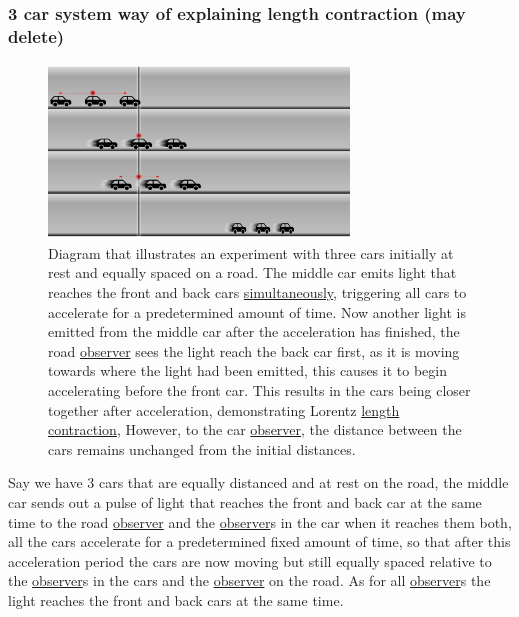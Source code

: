 \subsubsection{3 car system way of explaining length contraction (may delete)}

\begin{figure}[ht]
	\centering
	\includegraphics[width=8cm]{images/pdf/cars.pdf}
	\caption{Diagram that illustrates an experiment with three cars initially at rest and equally spaced on a road. The middle car emits light that reaches the front and back cars \protect\hyperlink{def-simultaneity}{simultaneously}, triggering all cars to accelerate for a predetermined amount of time. Now another light is emitted from the middle car after the acceleration has finished, the road \protect\hyperlink{def-observer}{observer} sees the light reach the back car first, as it is moving towards where the light had been emitted, this causes it to begin accelerating before the front car. This results in the cars being closer together after acceleration, demonstrating Lorentz \protect\hyperlink{def-length-contraction}{length contraction}, However, to the car \protect\hyperlink{def-observer}{observer}, the distance between the cars remains unchanged from the initial distances.}
	\label{fig: cars}
\end{figure}

Say we have 3 cars that are equally distanced and at rest on the road, the middle car sends out a pulse of light that reaches the front and back car at the same time to the road \hyperlink{def-observer}{observer} and the \hyperlink{def-observer}{observer}s in the car when it reaches them both, all the cars accelerate for a predetermined fixed amount of time, so that after this acceleration period the cars are now moving but still equally spaced relative to the \hyperlink{def-observer}{observer}s in the cars and the \hyperlink{def-observer}{observer} on the road. As for all \hyperlink{def-observer}{observer}s the light reaches the front and back cars at the same time.

